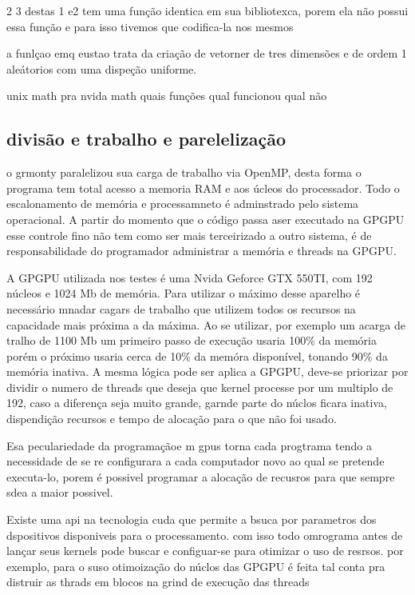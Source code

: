     2 3 destas 1 e2 tem uma função identica  em sua bibliotexca, porem ela não possui essa função e para isso tivemos que codifica-la nos mesmos

    a funlçao emq eustao trata da criação de vetorner de tres dimensões e de ordem 1 aleátorios com uma dispeção uniforme.

    unix math pra nvida math
    quais funções
      qual funcionou
      qual não

  \subsection{divisão e trabalho e parelelização}
    o grmonty paralelizou sua carga de trabalho via OpenMP, desta forma o programa tem total acesso a memoria RAM e aos úcleos do processador. Todo o escalonamento de memória e processamneto é adminstrado pelo sistema operacional. A partir do momento que o código passa aser executado na GPGPU esse controle fino não tem como ser mais terceirizado a outro sistema, é de responsabilidade do programador administrar a memória e threads na GPGPU.

    A GPGPU utilizada nos testes é uma Nvida Geforce GTX 550TI, com 192 núcleos e 1024 Mb de memória. Para utilizar o máximo desse aparelho é necessário mnadar cagars de trabalho que utilizem todos os recursos na capacidade mais próxima a da máxima. Ao se utilizar, por exemplo um acarga de tralho de 1100 Mb um primeiro passo de execução usaria 100\% da memória porém o próximo usaria cerca de 10\% da memóra disponível, tonando 90\% da memória inativa. A mesma lógica pode ser aplica a GPGPU, deve-se priorizar por dividir o numero de threads que deseja que  kernel processe por um multiplo de 192, caso a diferença seja muito grande, garnde parte do núclos ficara inativa, dispendição recursos e tempo de alocação para o que não foi usado.

    Esa peculariedade da programaçãoe m gpus torna cada progtrama tendo a necessidade de se re configurara a cada computador novo ao qual se pretende executa-lo, porem é possivel programar a alocação de recusros para que sempre sdea a maior possivel.

    Existe uma api na tecnologia cuda que permite a bsuca por parametros dos dspositivos disponiveis para o processamento. com isso todo omrograma antes de lançar seus kernels pode buscar e configuar-se para otimizar o uso de resrsos. por exemplo, para o suso otimoização do núclos das GPGPU é feita tal conta pra distruir as thrads em blocos na grind de execução das threads


